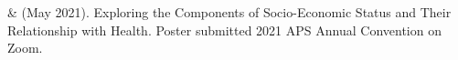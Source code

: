 
\item \yrh \& \meb (May 2021). Exploring the Components of Socio-Economic Status and Their Relationship with Health. Poster submitted 2021 APS Annual Convention on Zoom.

